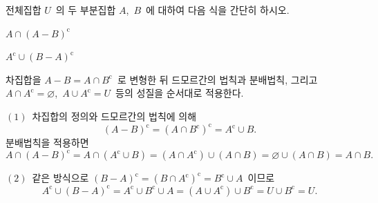 \documentclass[10pt]{article}
\begin{document}


\newpage


\begin{dmproblem}
전체집합 $U$\ 의 두 부분집합 $A$,\ $B$\ 에 대하여 다음 식을 간단히 하시오.

\vspace{3mm}
 $A \cap (A - B)^\mathrm{c}$

\vspace{3mm}
 $A^\mathrm{c} \cup (B - A)^\mathrm{c}$
\end{dmproblem}

\begin{dmapproach}
차집합을 $A - B = A \cap B^\mathrm{c}$\ 로 변형한 뒤 드모르간의 법칙과 분배법칙, 그리고 $A \cap A^\mathrm{c} = \varnothing$,\ $A \cup A^\mathrm{c} = U$\ 등의 성질을 순서대로 적용한다.
\end{dmapproach}

\begin{dmsolution}
$(1)$\ 차집합의 정의와 드모르간의 법칙에 의해
\[ (A - B)^\mathrm{c} = (A \cap B^\mathrm{c})^\mathrm{c} = A^\mathrm{c} \cup B. \]
분배법칙을 적용하면
\[ A \cap (A - B)^\mathrm{c} = A \cap (A^\mathrm{c} \cup B) = (A \cap A^\mathrm{c}) \cup (A \cap B) = \varnothing \cup (A \cap B) = A \cap B. \]

$(2)$\ 같은 방식으로 $(B - A)^\mathrm{c} = (B \cap A^\mathrm{c})^\mathrm{c} = B^\mathrm{c} \cup A$\ 이므로
\[ A^\mathrm{c} \cup (B - A)^\mathrm{c} = A^\mathrm{c} \cup B^\mathrm{c} \cup A = (A \cup A^\mathrm{c}) \cup B^\mathrm{c} = U \cup B^\mathrm{c} = U. \]
\end{dmsolution}

\dmchecktitle

\end{document}

